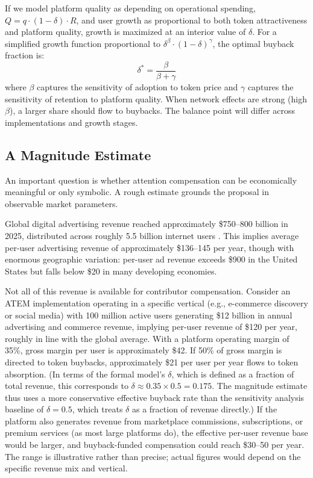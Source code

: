 \documentclass[12pt, a4paper]{article}
\begin{document}
If we model platform quality as depending on operational spending, $Q = q \cdot (1 - \delta) \cdot R$, and user growth as proportional to both token attractiveness and platform quality, growth is maximized at an interior value of $\delta$. For a simplified growth function proportional to $\delta^\beta \cdot (1 - \delta)^\gamma$, the optimal buyback fraction is:
\begin{equation}
\delta^* = \frac{\beta}{\beta + \gamma}
\label{eq:optimal-delta}
\end{equation}
where $\beta$ captures the sensitivity of adoption to token price and $\gamma$ captures the sensitivity of retention to platform quality. When network effects are strong (high $\beta$), a larger share should flow to buybacks. The balance point will differ across implementations and growth stages.

\subsection{A Magnitude Estimate}
\label{sec:model-magnitude}

An important question is whether attention compensation can be economically meaningful or only symbolic. A rough estimate grounds the proposal in observable market parameters.

Global digital advertising revenue reached approximately \$750--800 billion in 2025, distributed across roughly 5.5 billion internet users \citep{emarketer2025}. This implies average per-user advertising revenue of approximately \$136--145 per year, though with enormous geographic variation: per-user ad revenue exceeds \$900 in the United States but falls below \$20 in many developing economies.

Not all of this revenue is available for contributor compensation. Consider an ATEM implementation operating in a specific vertical (e.g., e-commerce discovery or social media) with 100 million active users generating \$12 billion in annual advertising and commerce revenue, implying per-user revenue of \$120 per year, roughly in line with the global average. With a platform operating margin of 35\%, gross margin per user is approximately \$42. If 50\% of gross margin is directed to token buybacks, approximately \$21 per user per year flows to token absorption. (In terms of the formal model's $\delta$, which is defined as a fraction of total revenue, this corresponds to $\delta \approx 0.35 \times 0.5 = 0.175$. The magnitude estimate thus uses a more conservative effective buyback rate than the sensitivity analysis baseline of $\delta = 0.5$, which treats $\delta$ as a fraction of revenue directly.) If the platform also generates revenue from marketplace commissions, subscriptions, or premium services (as most large platforms do), the effective per-user revenue base would be larger, and buyback-funded compensation could reach \$30--50 per year. The range is illustrative rather than precise; actual figures would depend on the specific revenue mix and vertical.
\end{document}
